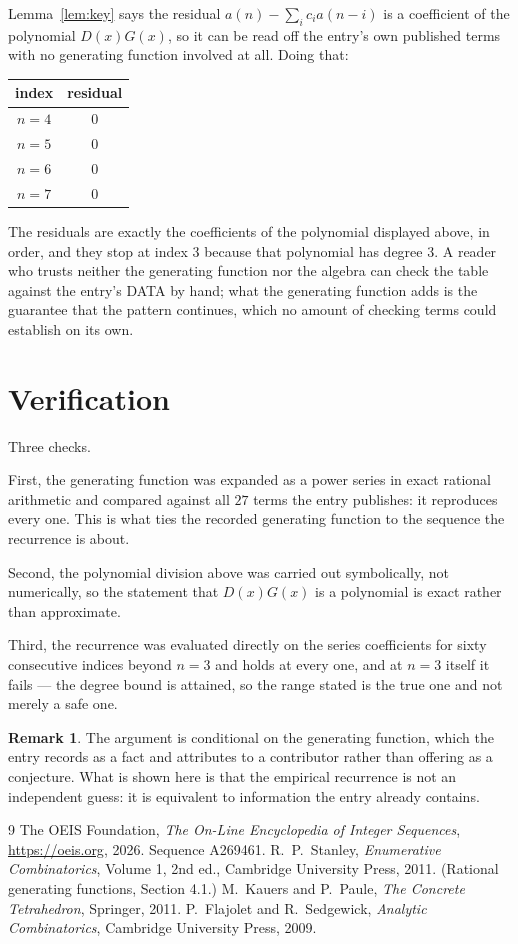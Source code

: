 \documentclass[11pt,a4paper]{article}
\theoremstyle{plain}
\theoremstyle{definition}
\newtheorem{remark}[theorem]{Remark}
\begin{document}
Lemma~\ref{lem:key} says the residual $a(n)-\sum_ic_ia(n-i)$ is a coefficient of the
polynomial $D(x)G(x)$, so it can be read off the entry's own published terms with no
generating function involved at all. Doing that:
\begin{center}
\begin{tabular}{cc}
index & residual \\ \hline
$n=4$ & $0$ \\
$n=5$ & $0$ \\
$n=6$ & $0$ \\
$n=7$ & $0$
\end{tabular}
\end{center}
The residuals are exactly the coefficients of the polynomial displayed above, in order, and
they stop at index $3$ because that polynomial has degree $3$. A reader who trusts
neither the generating function nor the algebra can check the table against the entry's DATA
by hand; what the generating function adds is the guarantee that the pattern continues, which
no amount of checking terms could establish on its own.

\section{Verification}

Three checks.

First, the generating function was expanded as a power series in exact rational arithmetic and
compared against all $27$ terms the entry publishes: it reproduces every one. This is
what ties the recorded generating function to the sequence the recurrence is about.

Second, the polynomial division above was carried out symbolically, not numerically, so the
statement that $D(x)G(x)$ is a polynomial is exact rather than approximate.

Third, the recurrence was evaluated directly on the series coefficients for sixty consecutive
indices beyond $n=3$ and holds at every one, and at $n=3$ itself it fails --- the
degree bound is attained, so the range stated is the true one and not merely a safe one.

\begin{remark}
The argument is conditional on the generating function, which the entry records as a fact and
attributes to a contributor rather than offering as a conjecture. What is shown here is that
the empirical recurrence is not an independent guess: it is equivalent to information the
entry already contains.
\end{remark}

\begin{thebibliography}{9}
 The OEIS Foundation, \emph{The On-Line Encyclopedia of Integer
Sequences}, \url{https://oeis.org}, 2026. Sequence A269461.
 R.~P.~Stanley, \emph{Enumerative Combinatorics}, Volume 1, 2nd ed.,
Cambridge University Press, 2011. (Rational generating functions, Section 4.1.)
 M.~Kauers and P.~Paule, \emph{The Concrete Tetrahedron}, Springer, 2011.
 P.~Flajolet and R.~Sedgewick, \emph{Analytic Combinatorics}, Cambridge
University Press, 2009.
\end{thebibliography}
\end{document}
